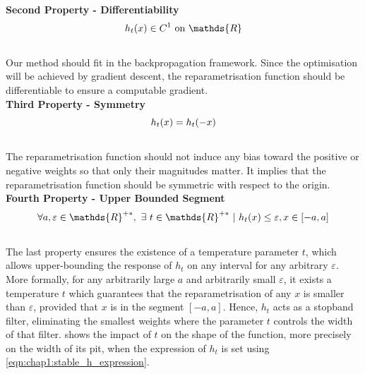\noindent\textbf{Second Property - Differentiability} \\
\begin{equation}
    \centering
    h_t(x) \in C^1 \text{ on } \mathds{R}
    \label{eqn:chap1:reparam_prop2}
\end{equation}
\\
Our method should fit in the backpropagation framework. Since the optimisation will
be achieved by gradient descent, the reparametrisation function should be
differentiable to ensure a computable gradient.\\

\noindent\textbf{Third Property - Symmetry} \\

\begin{equation}
    \centering
    h_t(x) = h_t(-x)
    \label{eqn:chap1:reparam_prop3}
\end{equation}
\\
The reparametrisation function should not induce any bias toward the positive or
negative weights so that only their magnitudes matter. It implies that the
reparametrisation function should be symmetric with respect to the origin.\\


\noindent\textbf{Fourth Property - Upper Bounded Segment} \\

\begin{equation}
    \centering
    \forall a,\varepsilon \in\mathds{R}^{+\ast},~ \exists ~t
    \in\mathds{R}^{+\ast} ~ | ~ h_t(x) \leq \varepsilon, x \in [-a,a]
    \label{eqn:chap1:reparam_prop4}
\end{equation}
\\
The last property ensures the existence of a temperature parameter $t$, which
allows upper-bounding the response of $h_t$ on any interval for any arbitrary
$\varepsilon$. More formally, for any arbitrarily large $a$ and arbitrarily
small $\varepsilon$, it exists a temperature $t$ which guarantees that the
reparametrisation of any $x$ is smaller than $\varepsilon$, provided that $x$ is
in the segment $[-a, a]$. Hence, $h_t$ acts as a stopband filter, eliminating
the smallest weights where the parameter $t$ controls the width of that filter.
 shows the impact of $t$ on the shape of
the function, more precisely on the width of its pit, when the expression of
$h_t$ is set using \cref{eqn:chap1:stable_h_expression}.\\

